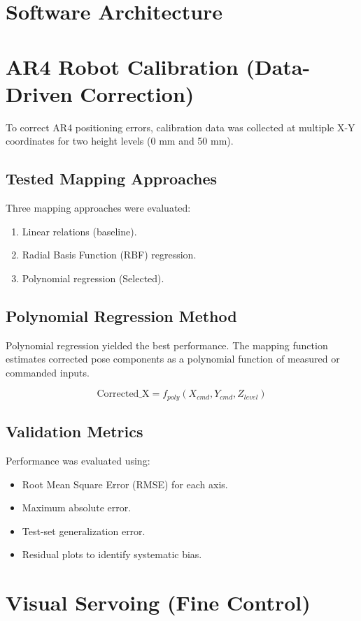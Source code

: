 \documentclass[15pt, a4paper]{extreport}
\begin{document}
\section{Software Architecture}
\section{AR4 Robot Calibration (Data-Driven Correction)}
To correct AR4 positioning errors, calibration data was collected at multiple X-Y coordinates for two height levels (0 mm and 50 mm).

\subsection{Tested Mapping Approaches}
Three mapping approaches were evaluated:
\begin{enumerate}
    \item Linear relations (baseline).
    \item Radial Basis Function (RBF) regression.
    \item Polynomial regression (Selected).
\end{enumerate}

\subsection{Polynomial Regression Method}
Polynomial regression yielded the best performance. The mapping function estimates corrected pose components as a polynomial function of measured or commanded inputs.

\begin{equation}
    \mathrm{Corrected\_X} = f_{poly}(X_{cmd}, Y_{cmd}, Z_{level})
\end{equation}
\subsection{Validation Metrics}
Performance was evaluated using:
\begin{itemize}
    \item Root Mean Square Error (RMSE) for each axis.
    \item Maximum absolute error.
    \item Test-set generalization error.
    \item Residual plots to identify systematic bias.
\end{itemize}

\section{Visual Servoing (Fine Control)}
\end{document}

